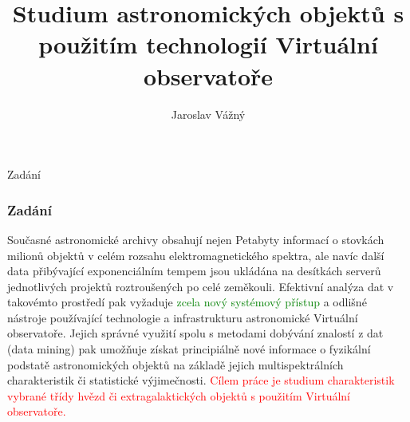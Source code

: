 \documentclass[fleqn]{beamer}
\title[Dobývání znalostí z astronomických dat] %
{Studium astronomických objektů s použitím technologií Virtuální observatoře}
\author[Jaroslav Vážný] %
{Jaroslav Vážný }
\institute[Universities of Somewhere and Elsewhere] %
{

    Masarykova univerzita

}
\begin{document}
 




\begin{frame}
  \titlepage
\end{frame}



\begin{section}{Zadání}
\begin{frame}\frametitle{Zadání}
    Současné astronomické archivy obsahují nejen Petabyty informací o
    stovkách milionů objektů v celém rozsahu elektromagnetického
    spektra, ale navíc další data přibývající exponenciálním tempem
    jsou ukládána na desítkách serverů jednotlivých projektů
    roztroušených po celé zeměkouli.  Efektivní analýza dat v
    takovémto prostředí pak vyžaduje \textcolor{green}{zcela nový
      systémový přístup} a odlišné nástroje používající technologie a
    infrastrukturu astronomické Virtuální observatoře. Jejich správné
    využití spolu s metodami dobývání znalostí z dat (data mining) pak
    umožňuje získat principiálně nové informace o fyzikální podstatě
    astronomických objektů na základě jejich multispektrálních
    charakteristik či statistické výjimečnosti.  \textcolor{red}{Cílem
      práce je studium charakteristik vybrané třídy hvězd či
      extragalaktických objektů s použitím Virtuální observatoře.}
\end{frame}
\end{section}
\end{document}
